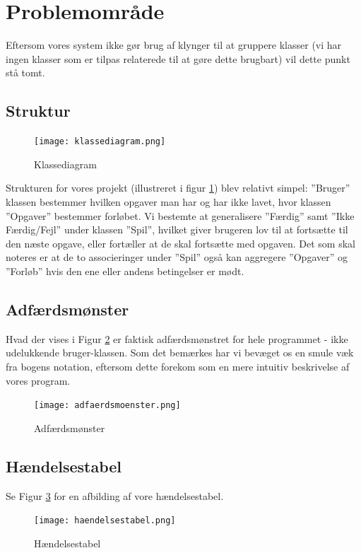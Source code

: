 \documentclass[10pt,a4paper,danish]{article}
\begin{document}
\section{Problemområde}
Eftersom vores system ikke gør brug af klynger til at gruppere klasser (vi har ingen klasser som er tilpas relaterede til at gøre dette brugbart) vil dette punkt stå tomt. 

\subsection{Struktur}
\begin{figure}[htb]
\begin{center}
\leavevmode
\texttt{[image: klassediagram.png]}
\end{center}
\caption{Klassediagram}
\label{fig:klassediagram}
\end{figure}

Strukturen for vores projekt (illustreret i figur \ref{fig:klassediagram}) blev relativt simpel: ”Bruger” klassen bestemmer hvilken opgaver man har og har ikke lavet, hvor klassen ”Opgaver” bestemmer forløbet. Vi bestemte at generalisere ”Færdig” samt ”Ikke Færdig/Fejl” under klassen ”Spil”, hvilket giver brugeren lov til at fortsætte til den næste opgave, eller fortæller at de skal fortsætte med opgaven. Det som skal noteres er at de to associeringer under ”Spil” også kan aggregere ”Opgaver” og ”Forløb” hvis den ene eller andens betingelser er mødt.

\subsection{Adfærdsmønster}
Hvad der vises i Figur \ref{fig:adfaerdsmoenster} er faktisk adfærdsmønstret for hele programmet - ikke udelukkende bruger-klassen. Som det bemærkes har vi bevæget os en smule væk fra bogens notation, eftersom dette forekom som en mere intuitiv beskrivelse af vores program. 
\begin{figure}[htb]
\begin{center}
\leavevmode
\texttt{[image: adfaerdsmoenster.png]}
\end{center}
\caption{Adfærdsmønster}
\label{fig:adfaerdsmoenster}
\end{figure}

\subsection{Hændelsestabel}
Se Figur \ref{fig:haendelsestabel} for en afbilding af vore hændelsestabel.
\begin{figure}[htb]
\begin{center}
\leavevmode
\texttt{[image: haendelsestabel.png]}
\end{center}
\caption{Hændelsestabel}
\label{fig:haendelsestabel}
\end{figure}
\end{document}
